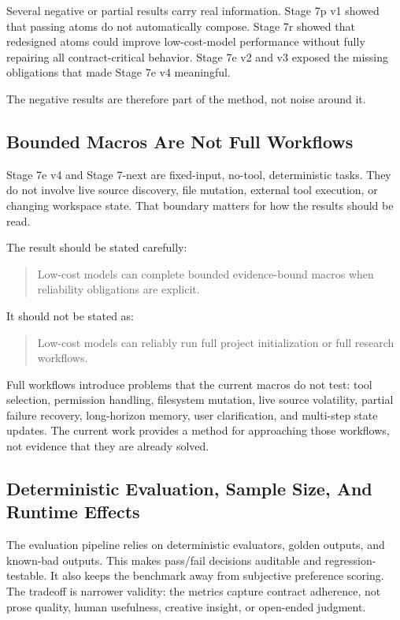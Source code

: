\documentclass[11pt]{article}
\begin{document}
Several negative or partial results carry real information. Stage 7p v1 showed that passing atoms do not automatically compose. Stage 7r showed that redesigned atoms could improve low-cost-model performance without fully repairing all contract-critical behavior. Stage 7e v2 and v3 exposed the missing obligations that made Stage 7e v4 meaningful.

The negative results are therefore part of the method, not noise around it.

\subsection{Bounded Macros Are Not Full Workflows}

Stage 7e v4 and Stage 7-next are fixed-input, no-tool, deterministic tasks. They do not involve live source discovery, file mutation, external tool execution, or changing workspace state. That boundary matters for how the results should be read.

The result should be stated carefully:

\begin{quote}
Low-cost models can complete bounded evidence-bound macros when reliability obligations are explicit.
\end{quote}

It should not be stated as:

\begin{quote}
Low-cost models can reliably run full project initialization or full research workflows.
\end{quote}

Full workflows introduce problems that the current macros do not test: tool selection, permission handling, filesystem mutation, live source volatility, partial failure recovery, long-horizon memory, user clarification, and multi-step state updates. The current work provides a method for approaching those workflows, not evidence that they are already solved.

\subsection{Deterministic Evaluation, Sample Size, And Runtime Effects}

The evaluation pipeline relies on deterministic evaluators, golden outputs, and known-bad outputs. This makes pass/fail decisions auditable and regression-testable. It also keeps the benchmark away from subjective preference scoring. The tradeoff is narrower validity: the metrics capture contract adherence, not prose quality, human usefulness, creative insight, or open-ended judgment.
\end{document}
